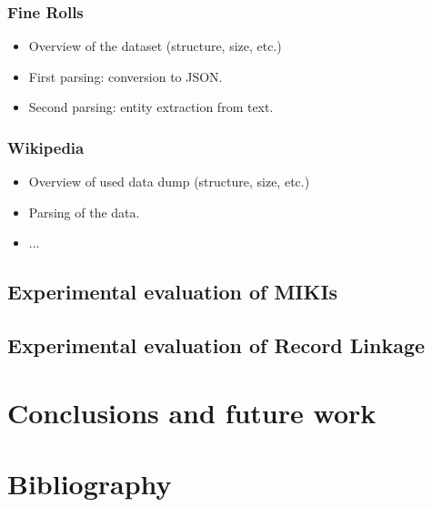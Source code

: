 \documentclass[paper=a4, fontsize=11pt]{scrartcl}					%
\numberwithin{equation}{section}					%
\numberwithin{figure}{section}						%
\numberwithin{table}{section}						%
\begin{document}
\subsubsection{Fine Rolls}

\begin{itemize}
	\item Overview of the dataset (structure, size, etc.)
	\item First parsing: conversion to JSON.
	\item Second parsing: entity extraction from text.
\end{itemize}


\subsubsection{Wikipedia}
	
\begin{itemize}
	\item Overview of used data dump (structure, size, etc.)
	\item Parsing of the data.
	\item ...
\end{itemize}

\subsection{Experimental evaluation of MIKIs}

\subsection{Experimental evaluation of Record Linkage}




\section{Conclusions and future work}




\section{Bibliography}


\end{document}
